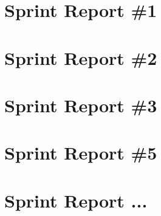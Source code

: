 
\section{Sprint Report \#1}


\newpage
\section{Sprint Report \#2}


\newpage
\section{Sprint Report \#3}


\newpage
\section{Sprint Report \#5}


\section{Sprint Report ...}
